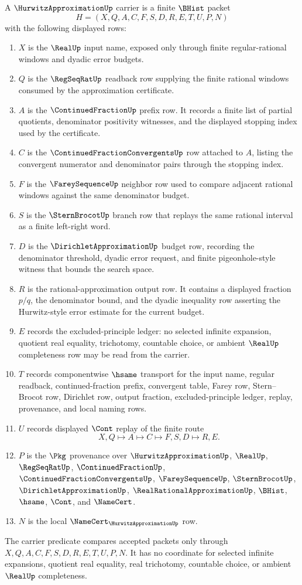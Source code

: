 \begin{definition}
\label{def:hurwitz-approximation-carrier}
A $\HurwitzApproximationUp$ carrier is a finite $\BHist$ packet
$$
H=(X,Q,A,C,F,S,D,R,E,T,U,P,N)
$$
with the following displayed rows:
\begin{enumerate}
\item $X$ is the $\RealUp$ input name, exposed only through finite regular-rational windows and dyadic error budgets.
\item $Q$ is the $\RegSeqRatUp$ readback row supplying the finite rational windows consumed by the approximation certificate.
\item $A$ is the $\ContinuedFractionUp$ prefix row. It records a finite list of partial quotients, denominator positivity witnesses, and the displayed stopping index used by the certificate.
\item $C$ is the $\ContinuedFractionConvergentsUp$ row attached to $A$, listing the convergent numerator and denominator pairs through the stopping index.
\item $F$ is the $\FareySequenceUp$ neighbor row used to compare adjacent rational windows against the same denominator budget.
\item $S$ is the $\SternBrocotUp$ branch row that replays the same rational interval as a finite left-right word.
\item $D$ is the $\DirichletApproximationUp$ budget row, recording the denominator threshold, dyadic error request, and finite pigeonhole-style witness that bounds the search space.
\item $R$ is the rational-approximation output row. It contains a displayed fraction $p/q$, the denominator bound, and the dyadic inequality row asserting the Hurwitz-style error estimate for the current budget.
\item $E$ records the excluded-principle ledger: no selected infinite expansion, quotient real equality, trichotomy, countable choice, or ambient $\RealUp$ completeness row may be read from the carrier.
\item $T$ records componentwise $\hsame$ transport for the input name, regular readback, continued-fraction prefix, convergent table, Farey row, Stern--Brocot row, Dirichlet row, output fraction, excluded-principle ledger, replay, provenance, and local naming rows.
\item $U$ records displayed $\Cont$ replay of the finite route
$$
X,Q \longmapsto A \longmapsto C \longmapsto F,S,D \longmapsto R,E .
$$
\item $P$ is the $\Pkg$ provenance over $\HurwitzApproximationUp$, $\RealUp$, $\RegSeqRatUp$, $\ContinuedFractionUp$, $\ContinuedFractionConvergentsUp$, $\FareySequenceUp$, $\SternBrocotUp$, $\DirichletApproximationUp$, $\RealRationalApproximationUp$, $\BHist$, $\hsame$, $\Cont$, and $\NameCert$.
\item $N$ is the local $\NameCert_{\HurwitzApproximationUp}$ row.
\end{enumerate}
The carrier predicate compares accepted packets only through $X,Q,A,C,F,S,D,R,E,T,U,P,N$. It has no coordinate for selected infinite expansions, quotient real equality, real trichotomy, countable choice, or ambient $\RealUp$ completeness.
\end{definition}
